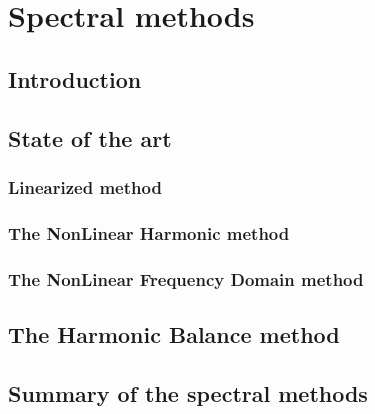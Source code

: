 \chapter{Spectral methods}
\label{cha:spectral_methods}

\section{Introduction}
\label{sec:sm_intro}


\section{State of the art}
\label{sec:sm_state_of_the_art}


\subsection{Linearized method}
\label{sub:sm_lur}


\subsection{The NonLinear Harmonic method}
\label{sub:sm_nlh}


\subsection{The NonLinear Frequency Domain method}
\label{sub:sm_nlfd}


\section{The Harmonic Balance method}
\label{sec:sm_hb}


\section{Summary of the spectral methods}
\label{sec:sm_summary}

